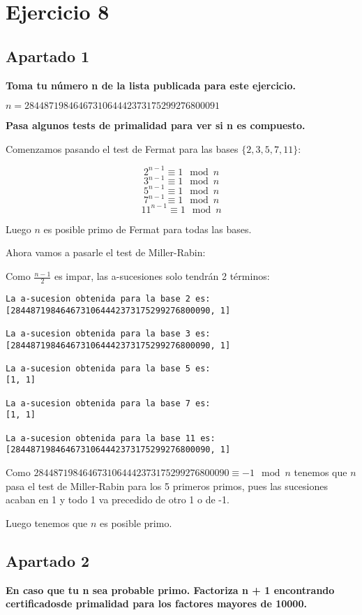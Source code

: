 \documentclass[a4paper]{article}
\title {\fbox{\Huge{\textbf{Ejercicio 8}}}}
\author {\fbox{Ana Buendía Ruiz-Azuaga}}
\begin{document}
\maketitle


\section{Ejercicio 8}

\subsection{Apartado 1}

\textbf{Toma tu número n de la lista publicada para este ejercicio.}

$n = 2844871984646731064442373175299276800091$

\textbf{Pasa algunos tests de primalidad para ver si n es compuesto.}

Comenzamos pasando el test de Fermat para las bases $\{2,3,5,7,11\}$:

$$2^{n-1}\equiv 1\mod n$$
$$3^{n-1}\equiv 1\mod n$$
$$5^{n-1}\equiv 1\mod n$$
$$7^{n-1}\equiv 1\mod n$$
$$11^{n-1}\equiv 1\mod n$$

Luego $n$ es posible primo de Fermat para todas las bases.

Ahora vamos a pasarle el test de Miller-Rabin:

Como $\frac{n-1}{2}$ es impar, las a-sucesiones solo tendrán 2 términos:

\begin{verbatim}
La a-sucesion obtenida para la base 2 es:
[2844871984646731064442373175299276800090, 1]

La a-sucesion obtenida para la base 3 es:
[2844871984646731064442373175299276800090, 1]

La a-sucesion obtenida para la base 5 es:
[1, 1]

La a-sucesion obtenida para la base 7 es:
[1, 1]

La a-sucesion obtenida para la base 11 es:
[2844871984646731064442373175299276800090, 1]
\end{verbatim}

Como $2844871984646731064442373175299276800090\equiv -1 \mod n$ tenemos que $n$ pasa el test de Miller-Rabin para los 5 primeros primos, pues las sucesiones acaban en 1 y todo 1 va precedido de otro 1 o de -1.

Luego tenemos que $n$ es posible primo.

\subsection{Apartado 2}
\textbf{En caso que tu n sea probable primo. Factoriza n + 1 encontrando certificadosde primalidad para los factores mayores de 10000.}
\end{document}
